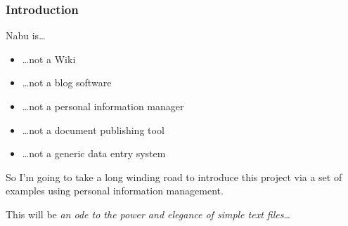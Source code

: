 \documentclass[compress,trans]{beamer}
\begin{document}
% 


\begin{frame}[fragile]
  \frametitle{Introduction}

  Nabu is\dots
  \begin{itemize}
  \item \dots not a Wiki
  \item \dots not a blog software
  \item \dots not a personal information manager
  \item \dots not a document publishing tool
  \item \dots not a generic data entry system
  \end{itemize}

\vfill\pause
  So I'm going to take a long winding road to introduce this project via a set
  of examples using personal information management.

\vfill
  This will be \emph{an ode to the power and elegance of simple text files}\dots

\end{frame}
\end{document}
